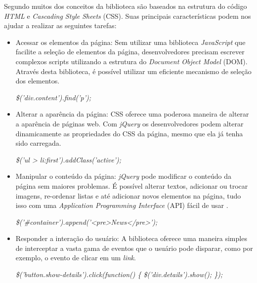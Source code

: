 Segundo  muitos dos conceitos da biblioteca são baseados na estrutura do código \textit{HTML} e \textit{Cascading Style Sheets} (CSS). Suas principais características podem nos ajudar a realizar as seguintes tarefas:

\begin{itemize}
\item Acessar os elementos da página: Sem utilizar uma biblioteca \textit{JavaScript} que facilite a seleção de elementos da página, desenvolvedores precisam escrever complexos scripts utilizando a estrutura do \textit{Document Object Model} (DOM). Através desta biblioteca, é possível utilizar um eficiente mecanismo de seleção dos elementos.

\begin{center}
\textit{\$('div.content').find('p');}
\end{center}

\item Alterar a aparência da página: CSS oferece uma poderosa maneira de alterar a aparência de páginas web. Com \textit{jQuery} os desenvolvedores podem alterar dinamicamente as propriedades do CSS da página, mesmo que ela já tenha sido carregada.

\begin{center}
\textit{\$('ul > li:first').addClass('active');}
\end{center}

\item Manipular o conteúdo da página: \textit{jQuery} pode modificar o conteúdo da página sem maiores problemas. É possível alterar textos, adicionar ou trocar imagens, re-ordenar listas e até adicionar novos elementos na página, tudo isso com uma \textit{Application Programming Interface} (API) fácil de usar \cite{JQUERY-API}.

\begin{center}
\textit{\$('\#container').append('<pre>News</pre>');}
\end{center}

\item Responder a interação do usuário: A biblioteca oferece uma maneira simples de interceptar a vasta gama de eventos que o usuário pode disparar, como por exemplo, o evento de clicar em um \textit{link}.

\begin{center}
\textit{\$('button.show-details').click(function() \{ \$('div.details').show(); \});}
\end{center}


\end{itemize}
